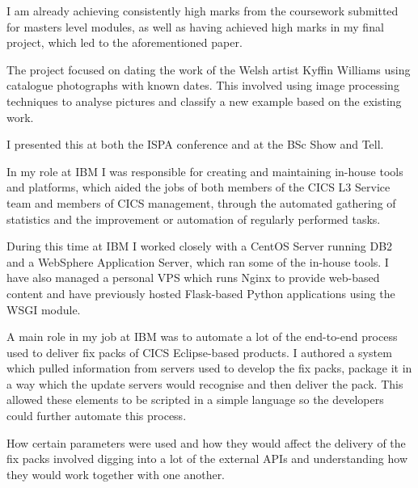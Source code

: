 \documentclass[10pt,stdletter,dateno,sigleft]{newlfm} %
\begin{document}
\begin{newlfm}
I am already achieving consistently high marks from the coursework submitted 
for masters level modules, as well as having achieved high marks in my final
project, which led to the aforementioned paper.

The project focused on dating the work of the Welsh artist Kyffin Williams 
using catalogue photographs with known dates. This involved using image 
processing techniques to analyse pictures and classify a new example based
on the existing work.

I presented this at both the ISPA conference and at the BSc Show and Tell.

In my role at IBM I was responsible for creating and maintaining in-house tools and 
platforms, which aided the jobs of both members of the CICS L3 Service team and members
of CICS management, through the automated gathering of statistics and the 
improvement or automation of regularly performed tasks.

During this time at IBM I worked closely with a CentOS Server running DB2 and a WebSphere 
Application Server, which ran some of the in-house tools. I have also managed a
personal VPS which runs Nginx to provide web-based content and have previously
hosted Flask-based Python applications using the WSGI module.

A main role in my job at IBM was to automate a lot of the end-to-end process 
used to deliver fix packs of CICS Eclipse-based products. I authored a system which pulled
information from servers used to develop the fix packs, package it in a way 
which the update servers would recognise and then deliver the pack.
This allowed these elements to be scripted in a simple language so
the developers could further automate this process.

How certain parameters were used and how they would affect the delivery of the fix
packs involved digging into a lot of the external APIs and understanding 
how they would work together with one another.


\end{newlfm}
\end{document}
